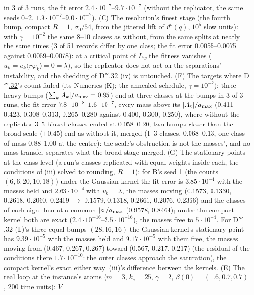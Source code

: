 \begin{sloppypar}
in 3 of 3 runs, the fit error $2.4\cdot10^{-7}$--$9.7\cdot10^{-7}$ (without the replicator, the same seeds 0--2,
$1.9\cdot10^{-7}$--$9.0\cdot10^{-7}$). (C) The resolution's finest stage (the fourth bump, compact $R = 1$,
$\sigma_0/64$, from the jittered lift of $\vartheta^b(q)$, $10^5$ slow units): with $\gamma = 10^{-2}$ the same 8--10
classes as without, from the same splits at nearly the same times (3 of 51 records differ by one class; the fit error
0.0055--0.0075 against 0.0059--0.0078): at a critical point of $L_w$ the fitness vanishes
($u_k = a_k\langle r\varphi_k\rangle = 0 = \lambda$), so the replicator does not act on the separations'
instability, and the shedding of \hyperref[res:thmDppp:32]{D$'''$.32} (iv) is untouched. (F) The targets where
\hyperref[res:thmDppp:32]{D$'''$.32}'s count failed (its Numerics (K); the annealed schedule, $\gamma = 10^{-2}$):
three heavy bumps ($\sum_k\lvert A_k\rvert/a_{\max} = 0.95$) end at three classes at the bumps in 3 of 3 runs, the fit error
$7.8\cdot10^{-8}$--$1.6\cdot10^{-7}$, every mass above its $\lvert A_k\rvert/a_{\max}$ (0.411--0.423, 0.308--0.313,
0.265--0.280 against 0.400, 0.300, 0.250), where without the replicator 3--5 biased classes ended at 0.058--0.20;
two bumps closer than the broad scale ($\pm0.45$) end as without it, merged (1--3 classes, 0.068--0.13, one class of
mass 0.88--1.00 at the centre): the scale's obstruction is not the masses', and no mass transfer separates what the
broad stage merged. (G) The stationary points at the class level (a run's classes replicated with equal weights
inside each, the conditions of (iii) solved to rounding, $R = 1$): for B's seed 1 (the counts $(6,6,20,10,18)$)
under the Gaussian kernel the fit error is $3.85\cdot10^{-4}$ with the masses held and $2.63\cdot10^{-4}$ with
$u_k = \lambda$, the masses moving (0.1573, 0.1330, 0.2618, 0.2060, 0.2419 $\to$ 0.1579, 0.1318, 0.2661, 0.2076,
0.2366) and the classes of each sign then at a common $\lvert a\rvert/a_{\max}$ (0.9578, 0.8464); under the compact kernel
both are exact ($2.4\cdot10^{-16}$--$2.5\cdot10^{-16}$), the masses free to $5\cdot10^{-4}$. For
\hyperref[res:thmDppp:32]{D$'''$.32} (L)'s three equal bumps $(28,16,16)$ the Gaussian kernel's stationary point has
$9.39\cdot10^{-5}$ with the masses held and $9.17\cdot10^{-5}$ with them free, the masses moving from (0.467, 0.267,
0.267) toward (0.567, 0.217, 0.217) (the residual of the conditions there $1.7\cdot10^{-10}$: the outer classes
approach the saturation), the compact kernel's exact either way: (iii)'s difference between the kernels. (E) The real
loop at the instance's atoms ($m = 3$, $k_e = 25$, $\gamma = 2$, $\beta(0) = (1.6, 0.7, 0.7)$, 200 time units): $V$

\end{sloppypar}
